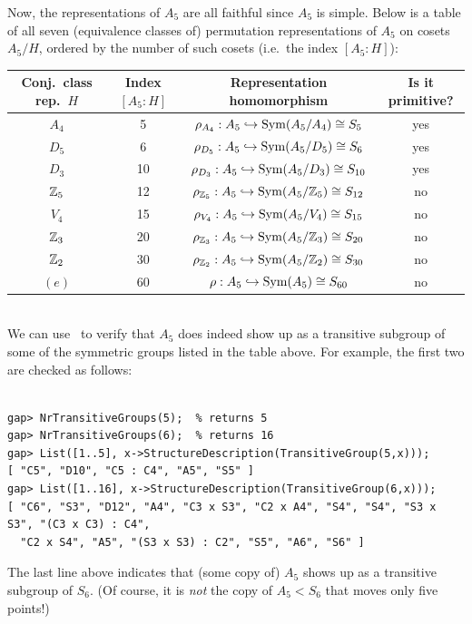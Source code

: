 Now, the representations of $A_5$ are all faithful since $A_5$ is simple.  Below is
a table of all seven (equivalence classes of) permutation representations of
$A_5$ on cosets $A_5/H$, ordered by the number of such cosets (i.e.~the index
$[A_5:H]$): \\
\begin{center}
\begin{tabular}{c|c|c|c}
Conj.~class rep.~$H$ & Index $[A_5: H]$ & Representation homomorphism & Is it primitive?\\
\hline
$A_4$ &  5 & $\rho_{A_4}  : A_5 \hookrightarrow \mathrm{Sym}(A_5/A_4) \cong S_5$ & yes \\
$D_5$ &  6 & $\rho_{D_5}  : A_5 \hookrightarrow \mathrm{Sym}(A_5/D_5) \cong S_6$ & yes \\
$D_3$ & 10 & $\rho_{D_3}  : A_5 \hookrightarrow \mathrm{Sym}(A_5/D_3) \cong S_{10}$ & yes \\
$\mathbb{Z}_5$& 12 & $\rho_{\mathbb{Z}_5} : A_5 \hookrightarrow \mathrm{Sym}(A_5/\mathbb{Z}_5) \cong S_{12}$ & no\\
$V_4$ & 15 & $\rho_{V_4}  : A_5 \hookrightarrow \mathrm{Sym}(A_5/V_4) \cong S_{15}$ & no\\
$\mathbb{Z}_3$& 20 & $\rho_{\mathbb{Z}_3} : A_5 \hookrightarrow \mathrm{Sym}(A_5/\mathbb{Z}_3) \cong S_{20}$ & no\\
$\mathbb{Z}_2$& 30 & $\rho_{\mathbb{Z}_2} : A_5 \hookrightarrow \mathrm{Sym}(A_5/\mathbb{Z}_2) \cong S_{30}$ & no\\
$(e)$& 60 & $\rho : A_5 \hookrightarrow \mathrm{Sym}(A_5) \cong S_{60}$ & no\\
\hline
\end{tabular}
\end{center}
~\\[4pt]
We can use \gap\ to verify that $A_5$ does indeed show up as a transitive
subgroup of some of the symmetric groups listed in the table above.  For
example, the first two are checked as follows:
{\codesize 
\begin{verbatim}

gap> NrTransitiveGroups(5);  % returns 5
gap> NrTransitiveGroups(6);  % returns 16
gap> List([1..5], x->StructureDescription(TransitiveGroup(5,x)));
[ "C5", "D10", "C5 : C4", "A5", "S5" ]
gap> List([1..16], x->StructureDescription(TransitiveGroup(6,x)));
[ "C6", "S3", "D12", "A4", "C3 x S3", "C2 x A4", "S4", "S4", "S3 x S3", "(C3 x C3) : C4", 
  "C2 x S4", "A5", "(S3 x S3) : C2", "S5", "A6", "S6" ]

\end{verbatim}}
\noindent The last line above indicates that (some copy of) $A_5$ shows up as a transitive
subgroup of $S_6$.  (Of course, it is \emph{not} the copy of $A_5< S_6$ that
moves only five points!) 

